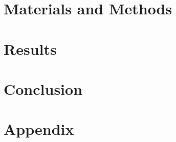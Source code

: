 \documentclass[a4paper]{article}
\begin{document}
\section{Materials and Methods}

\section{Results}

\section{Conclusion}
\label{sec:conclusion}
%

\newpage

%
%

\newpage
\section{Appendix}

\end{document}
